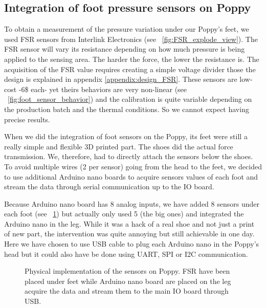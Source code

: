 \subsection{Integration of foot pressure sensors on Poppy} %

To obtain a measurement of the pressure variation under our Poppy's feet, we used FSR sensors from Interlink Electronics (see \figurename~\ref{fig:FSR_explode_view}). The FSR sensor will vary its resistance depending on how much pressure is being applied to the sensing area. The harder the force, the lower the resistance is. The acquisition of the FSR value requires creating a simple voltage divider those the design is explained in appendix \ref{appendix:design_FSR}. These sensors are low-cost -6\$ each- yet theirs behaviors are very non-linear (see \figurename~\ref{fig:foot_sensor_behavior}) and the calibration is quite variable depending on the production batch and the thermal conditions. So we cannot expect having precise results.

When we did the integration of foot sensors on the Poppy, its feet were still a really simple and flexible 3D printed part. The shoes did the actual force transmission. We, therefore, had to directly attach the sensors below the shoes.
To avoid multiple wires (2 per sensor) going from the head to the feet, we decided to use additional Arduino nano boards to acquire sensors values of each foot and stream the data through serial communication up to the IO board.

Because Arduino nano board has 8 analog inputs, we have added 8 sensors under each foot (see \figurename~\ref{fig:poppy_foot_sensors}) but actually only used 5 (the big ones) and integrated the Arduino nano in the leg. While it was a hack of a real shoe and not just a print of new part, the intervention was quite annoying but still achievable in one day. Here we have chosen to use USB cable to plug each Arduino nano in the Poppy's head but it could also have be done using UART, SPI or I2C communication.

\begin{figure}[ht]
\centering
    \hfill
    \caption{Physical implementation of the sensors on Poppy. FSR have been placed under feet while Arduino nano board are placed on the leg acquire the data and stream them to the main IO board through USB.}
    \label{fig:poppy_foot_sensors}
\end{figure}


